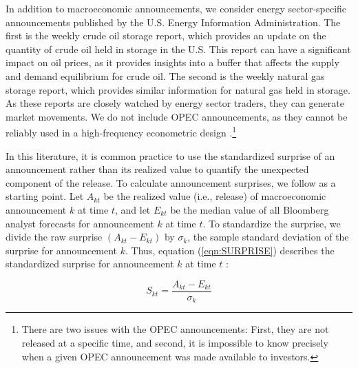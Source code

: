 In addition to macroeconomic announcements, we consider energy sector-specific announcements published by the U.S. Energy Information Administration. The first is the weekly crude oil storage report, which provides an update on the quantity of crude oil held in storage in the U.S. This report can have a significant impact on oil prices, as it provides insights into a buffer that affects the supply and demand equilibrium for crude oil. The second is the weekly natural gas storage report, which provides similar information for natural gas held in storage. As these reports are closely watched by energy sector traders, they can generate market movements. We do not include OPEC announcements, as they cannot be reliably used in a high-frequency econometric design \citep{10.1257/aer.20190964}.\footnote{There are two issues with the OPEC announcements: First, they are not released at a specific time, and second, it is impossible to know precisely when a given OPEC announcement was made available to investors.} 


In this literature, it is common practice to use the standardized surprise of an announcement  rather than its realized value  to quantify the unexpected component of the release. To calculate announcement surprises, we follow  \citet*{balduzzi2001economic} as a starting point. Let  $A_{kt}$ be the realized value (i.e., release) of macroeconomic announcement $k$ at time $t$, and let $E_{kt}$ be the median value of all Bloomberg analyst forecasts for announcement $k$ at time $t$.  To standardize the surprise, we divide the raw surprise $(A_{kt}-E_{kt})$ by $\sigma_k$, the sample standard deviation of the surprise for announcement $k$. Thus, equation (\ref{eqn:SURPRISE}) describes the standardized surprise for  announcement $k$ at time $t$ :

\begin{equation}\label{eqn:SURPRISE}
S_{kt}=\frac{A_{kt}-E_{kt}}{\sigma_k}
\end{equation}



